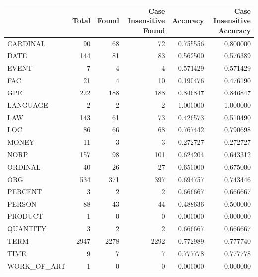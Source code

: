 \begin{tabular}{lrrrrr}
\toprule
 & Total & Found & Case Insensitive Found & Accuracy & Case Insensitive Accuracy \\
\midrule
CARDINAL & 90 & 68 & 72 & 0.755556 & 0.800000 \\
DATE & 144 & 81 & 83 & 0.562500 & 0.576389 \\
EVENT & 7 & 4 & 4 & 0.571429 & 0.571429 \\
FAC & 21 & 4 & 10 & 0.190476 & 0.476190 \\
GPE & 222 & 188 & 188 & 0.846847 & 0.846847 \\
LANGUAGE & 2 & 2 & 2 & 1.000000 & 1.000000 \\
LAW & 143 & 61 & 73 & 0.426573 & 0.510490 \\
LOC & 86 & 66 & 68 & 0.767442 & 0.790698 \\
MONEY & 11 & 3 & 3 & 0.272727 & 0.272727 \\
NORP & 157 & 98 & 101 & 0.624204 & 0.643312 \\
ORDINAL & 40 & 26 & 27 & 0.650000 & 0.675000 \\
ORG & 534 & 371 & 397 & 0.694757 & 0.743446 \\
PERCENT & 3 & 2 & 2 & 0.666667 & 0.666667 \\
PERSON & 88 & 43 & 44 & 0.488636 & 0.500000 \\
PRODUCT & 1 & 0 & 0 & 0.000000 & 0.000000 \\
QUANTITY & 3 & 2 & 2 & 0.666667 & 0.666667 \\
TERM & 2947 & 2278 & 2292 & 0.772989 & 0.777740 \\
TIME & 9 & 7 & 7 & 0.777778 & 0.777778 \\
WORK_OF_ART & 1 & 0 & 0 & 0.000000 & 0.000000 \\
\bottomrule
\end{tabular}
